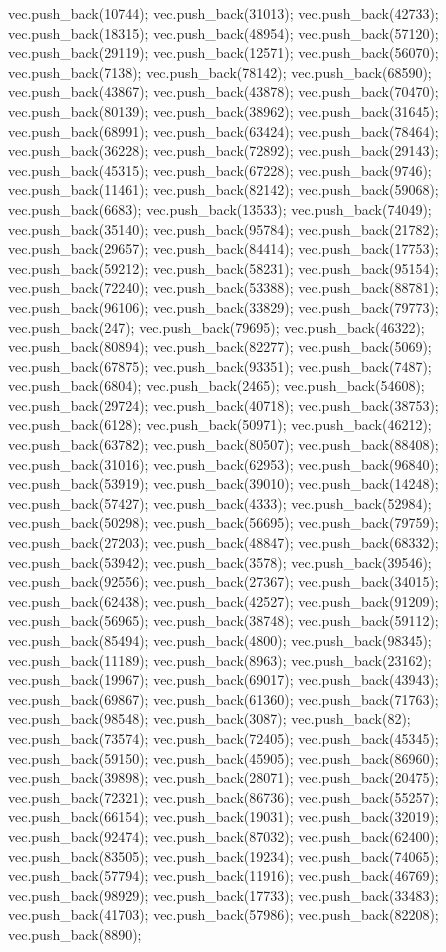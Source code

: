 vec.push_back(10744);
vec.push_back(31013);
vec.push_back(42733);
vec.push_back(18315);
vec.push_back(48954);
vec.push_back(57120);
vec.push_back(29119);
vec.push_back(12571);
vec.push_back(56070);
vec.push_back(7138);
vec.push_back(78142);
vec.push_back(68590);
vec.push_back(43867);
vec.push_back(43878);
vec.push_back(70470);
vec.push_back(80139);
vec.push_back(38962);
vec.push_back(31645);
vec.push_back(68991);
vec.push_back(63424);
vec.push_back(78464);
vec.push_back(36228);
vec.push_back(72892);
vec.push_back(29143);
vec.push_back(45315);
vec.push_back(67228);
vec.push_back(9746);
vec.push_back(11461);
vec.push_back(82142);
vec.push_back(59068);
vec.push_back(6683);
vec.push_back(13533);
vec.push_back(74049);
vec.push_back(35140);
vec.push_back(95784);
vec.push_back(21782);
vec.push_back(29657);
vec.push_back(84414);
vec.push_back(17753);
vec.push_back(59212);
vec.push_back(58231);
vec.push_back(95154);
vec.push_back(72240);
vec.push_back(53388);
vec.push_back(88781);
vec.push_back(96106);
vec.push_back(33829);
vec.push_back(79773);
vec.push_back(247);
vec.push_back(79695);
vec.push_back(46322);
vec.push_back(80894);
vec.push_back(82277);
vec.push_back(5069);
vec.push_back(67875);
vec.push_back(93351);
vec.push_back(7487);
vec.push_back(6804);
vec.push_back(2465);
vec.push_back(54608);
vec.push_back(29724);
vec.push_back(40718);
vec.push_back(38753);
vec.push_back(6128);
vec.push_back(50971);
vec.push_back(46212);
vec.push_back(63782);
vec.push_back(80507);
vec.push_back(88408);
vec.push_back(31016);
vec.push_back(62953);
vec.push_back(96840);
vec.push_back(53919);
vec.push_back(39010);
vec.push_back(14248);
vec.push_back(57427);
vec.push_back(4333);
vec.push_back(52984);
vec.push_back(50298);
vec.push_back(56695);
vec.push_back(79759);
vec.push_back(27203);
vec.push_back(48847);
vec.push_back(68332);
vec.push_back(53942);
vec.push_back(3578);
vec.push_back(39546);
vec.push_back(92556);
vec.push_back(27367);
vec.push_back(34015);
vec.push_back(62438);
vec.push_back(42527);
vec.push_back(91209);
vec.push_back(56965);
vec.push_back(38748);
vec.push_back(59112);
vec.push_back(85494);
vec.push_back(4800);
vec.push_back(98345);
vec.push_back(11189);
vec.push_back(8963);
vec.push_back(23162);
vec.push_back(19967);
vec.push_back(69017);
vec.push_back(43943);
vec.push_back(69867);
vec.push_back(61360);
vec.push_back(71763);
vec.push_back(98548);
vec.push_back(3087);
vec.push_back(82);
vec.push_back(73574);
vec.push_back(72405);
vec.push_back(45345);
vec.push_back(59150);
vec.push_back(45905);
vec.push_back(86960);
vec.push_back(39898);
vec.push_back(28071);
vec.push_back(20475);
vec.push_back(72321);
vec.push_back(86736);
vec.push_back(55257);
vec.push_back(66154);
vec.push_back(19031);
vec.push_back(32019);
vec.push_back(92474);
vec.push_back(87032);
vec.push_back(62400);
vec.push_back(83505);
vec.push_back(19234);
vec.push_back(74065);
vec.push_back(57794);
vec.push_back(11916);
vec.push_back(46769);
vec.push_back(98929);
vec.push_back(17733);
vec.push_back(33483);
vec.push_back(41703);
vec.push_back(57986);
vec.push_back(82208);
vec.push_back(8890);
